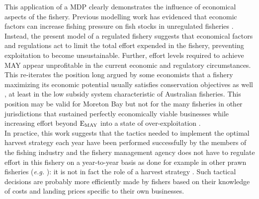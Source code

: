 This application of a MDP clearly demonstrates the influence of economical aspects of the fishery. Previous modelling work has evidenced that economic factors can increase fishing pressure on fish stocks in unregulated fisheries \citep{quin99b}. Instead, the present model of a regulated fishery suggests that economical factors and regulations act to limit the total effort expended in the fishery, preventing exploitation to become unsustainable. Further, effort levels required to achieve MAY appear unprofitable in the current economic and regulatory circumstances. This re-iterates the position long argued by some economists that a fishery maximizing its economic potential usually satisfies conservation objectives as well \citep{clark2017a}, at least in the low subsidy system characteristic of Australian fisheries. This position may be valid for Moreton Bay but not for the many fisheries in other jurisdictions that sustained perfectly economically viable businesses while increasing effort beyond ${\rm E_{MAY}}$ into a state of over-exploitation \citep{hilborn2011overfishing}.  \\

In practice, this work suggests that the tactics needed to implement the optimal harvest strategy each year have been performed successfully by the members of the fishing industry and the fishery management agency does not have to regulate effort in this fishery on a year-to-year basis as done for example in other prawn fisheries ({\it e.g.} \cite{Dichmont05012010}): it is not in fact the role of a harvest strategy \citep{hil92b}. Such tactical decisions are probably more efficiently made by fishers based on their knowledge of costs and landing prices specific to their own businesses. %

